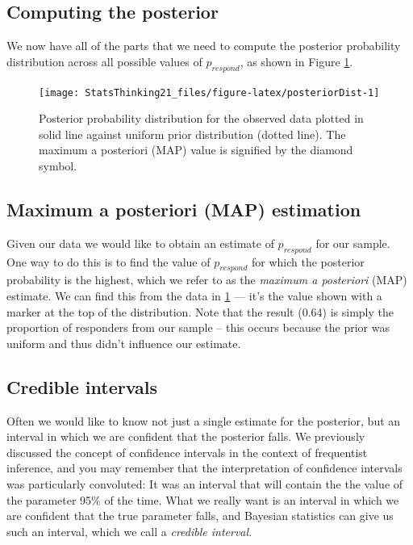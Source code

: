 \documentclass[12pt,]{book}
\theoremstyle{definition}
\theoremstyle{definition}
\theoremstyle{definition}
\theoremstyle{remark}
\begin{document}
\hypertarget{computing-the-posterior-1}{%
\subsection{Computing the posterior}\label{computing-the-posterior-1}}

We now have all of the parts that we need to compute the posterior probability distribution across all possible values of \(p_{respond}\), as shown in Figure \ref{fig:posteriorDist}.

\begin{figure}
\texttt{[image: StatsThinking21\_files/figure-latex/posteriorDist-1]} \caption{Posterior probability distribution for the observed data plotted in solid line against uniform prior distribution (dotted line). The maximum a posteriori (MAP) value is signified by the diamond symbol.}\label{fig:posteriorDist}
\end{figure}

\hypertarget{maximum-a-posteriori-map-estimation}{%
\subsection{Maximum a posteriori (MAP) estimation}\label{maximum-a-posteriori-map-estimation}}

Given our data we would like to obtain an estimate of \(p_{respond}\) for our sample. One way to do this is to find the value of \(p_{respond}\) for which the posterior probability is the highest, which we refer to as the \emph{maximum a posteriori} (MAP) estimate. We can find this from the data in \ref{fig:posteriorDist} --- it's the value shown with a marker at the top of the distribution. Note that the result (0.64) is simply the proportion of responders from our sample -- this occurs because the prior was uniform and thus didn't influence our estimate.

\hypertarget{credible-intervals}{%
\subsection{Credible intervals}\label{credible-intervals}}

Often we would like to know not just a single estimate for the posterior, but an interval in which we are confident that the posterior falls. We previously discussed the concept of confidence intervals in the context of frequentist inference, and you may remember that the interpretation of confidence intervals was particularly convoluted: It was an interval that will contain the the value of the parameter 95\% of the time. What we really want is an interval in which we are confident that the true parameter falls, and Bayesian statistics can give us such an interval, which we call a \emph{credible interval}.
\end{document}
